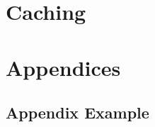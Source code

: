 \documentclass[a4paper]{article}
\begin{document}
\clearpage
\section{Caching}


\newpage
\printbibliography



\newpage
\appendix

\section{Appendices}

\newpage
\subsection{Appendix Example}


\end{document}
